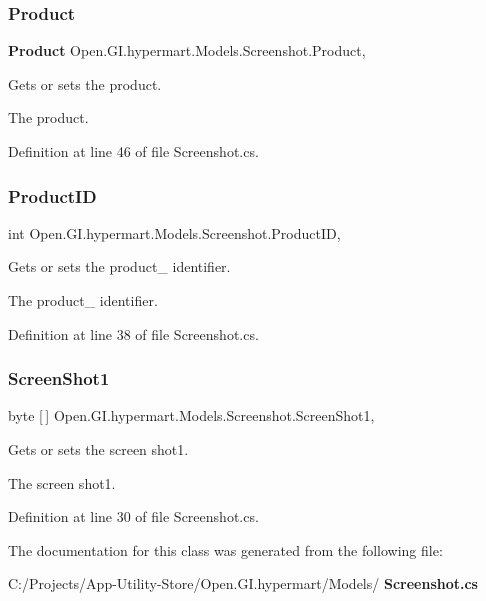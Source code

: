 \subsubsection{Product\hspace{0.1cm}{\footnotesize\ttfamily [2/2]}}
{\footnotesize\ttfamily \textbf{ Product} Open.\+G\+I.\+hypermart.\+Models.\+Screenshot.\+Product\hspace{0.3cm}{\ttfamily [get]}, {\ttfamily [set]}}



Gets or sets the product. 

The product. 

Definition at line 46 of file Screenshot.\+cs.

\mbox{\label{class_open_1_1_g_i_1_1hypermart_1_1_models_1_1_screenshot_ad381abf51bb0ebb1c2566c70df11c05a}} 
\subsubsection{Product\+ID}
{\footnotesize\ttfamily int Open.\+G\+I.\+hypermart.\+Models.\+Screenshot.\+Product\+ID\hspace{0.3cm}{\ttfamily [get]}, {\ttfamily [set]}}



Gets or sets the product\+\_\+ identifier. 

The product\+\_\+ identifier. 

Definition at line 38 of file Screenshot.\+cs.

\mbox{\label{class_open_1_1_g_i_1_1hypermart_1_1_models_1_1_screenshot_a435ca1863d66de2de497d603585610d8}} 
\subsubsection{Screen\+Shot1}
{\footnotesize\ttfamily byte [$\,$] Open.\+G\+I.\+hypermart.\+Models.\+Screenshot.\+Screen\+Shot1\hspace{0.3cm}{\ttfamily [get]}, {\ttfamily [set]}}



Gets or sets the screen shot1. 

The screen shot1. 

Definition at line 30 of file Screenshot.\+cs.



The documentation for this class was generated from the following file\+:\begin{DoxyCompactItemize}
\item 
C\+:/\+Projects/\+App-\/\+Utility-\/\+Store/\+Open.\+G\+I.\+hypermart/\+Models/\textbf{ Screenshot.\+cs}\end{DoxyCompactItemize}
